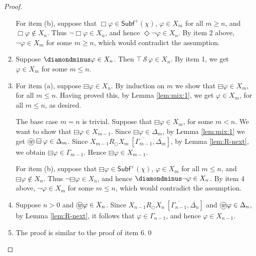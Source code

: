 \documentclass[envcountsect,envcountsame,oribibl,orivec]{llncs}
\newcommand*\circled[1]{\tikz[baseline=(char.base)]{
		\node[shape=circle,draw,inner sep=0.4pt] (char) {#1};}}
\newcommand{\lnext}{\bigcirc}
\newcommand{\lalways}{\Box}
\newcommand{\leventually}{\Diamond}
\newcommand{\lonce}{\diamondminus}
\newcommand{\lsofar}{\boxminus}
\newcommand{\lsince}{{\,\mathcal{S}\,}}
\newcommand{\wprevious}{\circled{\textit{w}}}
\renewcommand{\phi}{\varphi}
\newcommand{\Subf}{\mathsf{Subf}}
\newcommand{\RO}[4]{#1 R_\lnext #2\ [#3, #4]}
\begin{document}
\begin{proof}
\begin{enumerate}
		For item (b), suppose that $\lalways \phi \in \Subf^+(\chi)$, $\phi \in X_m$ for all $m \geq n$, and $\lalways \phi \not \in X_n$. Thus $\neg \lalways \phi \in X_{n}$, and hence $\leventually \neg \phi \in X_{n}$. By item 2 above, $\neg \phi \in X_m$ for some $m \geq n$, which would contradict the assumption.
		
		
		\item Suppose $\lonce \phi \in X_n$. Then $\top \lsince \phi \in X_{n}$. By item 1, we get $\phi \in X_{m}$ for some $m \leq n$. 
		
		\item For item (a), suppose $\lsofar \phi \in X_n$. By induction on $m$ we show that  $\lsofar \phi \in X_m$, for all $m \leq n$. Having proved this, by Lemma \ref{lem:mix:1}, we get $\phi \in X_m$, for all $m \leq n$, as desired. 
		
		The base case $m = n$ is trivial. Suppose that $\lsofar \phi \in X_m$, for some $m < n$. We want to show that $\lsofar \phi \in X_{m-1}$. Since $\lsofar \phi \in \Delta_m$, by Lemma \ref{lem:mix:1} we get $\wprevious \lsofar \phi \in \Delta_m$. Since $\RO{X_{m-1}}{X_{m}}{\overline{\Gamma_{m-1}}}{\overline{\Delta_{m}}}$, by Lemma \ref{lem:R-next}, we obtain $\lsofar \phi \in \Gamma_{m-1}$.  Hence $\lsofar \phi \in X_{m-1}$. 
		
		For item (b), suppose that $\lsofar \phi \in \Subf^+(\chi)$, $\phi \in X_m$ for all $m \leq n$, and $\lsofar \phi \not \in X_n$. Thus $\neg \lsofar \phi \in X_{n}$, and hence $\lonce \neg \phi \in X_{n}$. By item 4 above, $\neg \phi \in X_m$ for some $m \leq n$, which would contradict the assumption.
		
		\item Suppose $n > 0$ and $\wprevious \phi \in X_n$. Since $\RO{X_{n-1}}{X_{n}}{\overline{\Gamma_{n-1}}}{\overline{\Delta_{n}}}$ and $\wprevious \phi \in \Delta_n$, by Lemma \ref{lem:R-next},  it follows that $\phi \in \Gamma_{n-1}$, and hence $\phi \in X_{n-1}$. 
		
		\item The proof is similar to the proof of item 6.\qed
		
	\end{enumerate}
\end{proof}
\end{document}
